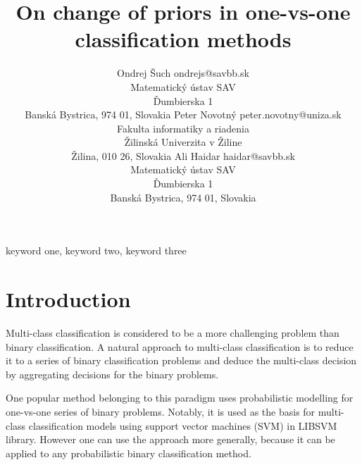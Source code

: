 \documentclass[twoside,11pt]{article}
\begin{document}
\title{On change of priors in one-vs-one classification methods}

\author{\name Ondrej Šuch \email ondrejs@savbb.sk \\
       \addr Matematický ústav SAV\\
       Ďumbierska 1\\
       Banská Bystrica, 974 01, Slovakia
       \AND
       \name Peter Novotný \email peter.novotny@uniza.sk \\
       \addr Fakulta informatiky a riadenia\\
       Žilinská Univerzita v Žiline\\
       Žilina, 010 26, Slovakia
       \AND
       \name Ali Haidar \email haidar@savbb.sk \\
       \addr Matematický ústav SAV\\
       Ďumbierska 1\\
       Banská Bystrica, 974 01, Slovakia
       }


\maketitle

\begin{abstract}%
\blindtext
\end{abstract}

\begin{keywords}
  keyword one, keyword two, keyword three
\end{keywords}

\section{Introduction}


Multi-class classification is considered to be a more challenging problem than binary classification.  A natural approach to multi-class classification is to reduce it to a series of binary classification problems and deduce the multi-class decision by aggregating decisions for the binary problems. 

One popular method belonging to  this paradigm uses probabilistic modelling for one-vs-one series of binary problems. Notably, it is used as the basis for multi-class classification models using support vector machines (SVM) in LIBSVM library. However one can use the approach more generally,  because it can be applied to any probabilistic binary classification method. 
\end{document}
